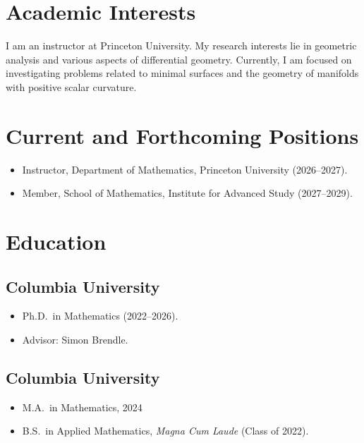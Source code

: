 \documentclass{cv_style}
\begin{document}

    \begin{center}  

 
	\end{center}
	
\section{Academic Interests}
	I am an instructor at Princeton University. My research interests lie in geometric analysis and various aspects of differential geometry. Currently, I am focused on investigating problems related to minimal surfaces and the geometry of manifolds with positive scalar curvature.

\section{Current and Forthcoming Positions}
		\begin{itemize}
			\item Instructor, Department of Mathematics, Princeton University (2026--2027).
			\item Member, School of Mathematics, Institute for Advanced Study (2027--2029).
		\end{itemize}

	\section{Education}
		\subsection{Columbia University}
				\begin{itemize}
					\item Ph.D.~in Mathematics (2022--2026).
					\item Advisor: Simon Brendle.
				\end{itemize}
				
		\subsection{Columbia University}
				\begin{itemize}
                    \item M.A.~in Mathematics, 2024
					\item B.S.~in Applied Mathematics, \textit{Magna Cum Laude} (Class of 2022).
				\end{itemize}
		
\end{document}
